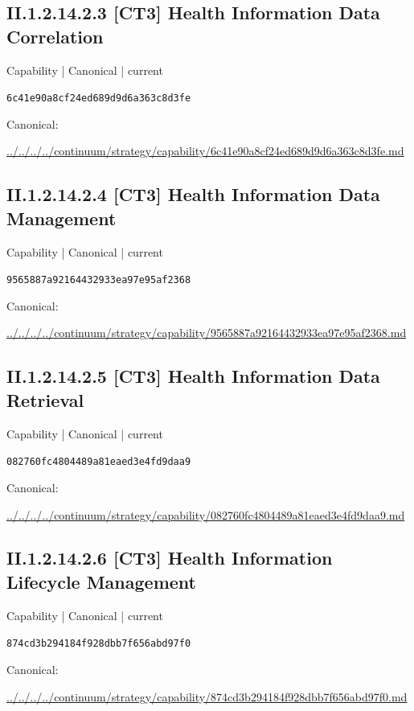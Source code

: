 \documentclass[10pt,a4paper]{article}
\begin{document}
\subsection*{II.1.2.14.2.3 [CT3] Health Information Data Correlation}
{\small Capability | Canonical | current}\par
\texttt{6c41e90a8cf24ed689d9d6a363c8d3fe}\par
Canonical: \par
{\footnotesize\url{../../../../continuum/strategy/capability/6c41e90a8cf24ed689d9d6a363c8d3fe.md}}\par
\subsection*{II.1.2.14.2.4 [CT3] Health Information Data Management}
{\small Capability | Canonical | current}\par
\texttt{9565887a92164432933ea97e95af2368}\par
Canonical: \par
{\footnotesize\url{../../../../continuum/strategy/capability/9565887a92164432933ea97e95af2368.md}}\par
\subsection*{II.1.2.14.2.5 [CT3] Health Information Data Retrieval}
{\small Capability | Canonical | current}\par
\texttt{082760fc4804489a81eaed3e4fd9daa9}\par
Canonical: \par
{\footnotesize\url{../../../../continuum/strategy/capability/082760fc4804489a81eaed3e4fd9daa9.md}}\par
\subsection*{II.1.2.14.2.6 [CT3] Health Information Lifecycle Management}
{\small Capability | Canonical | current}\par
\texttt{874cd3b294184f928dbb7f656abd97f0}\par
Canonical: \par
{\footnotesize\url{../../../../continuum/strategy/capability/874cd3b294184f928dbb7f656abd97f0.md}}\par
\end{document}
